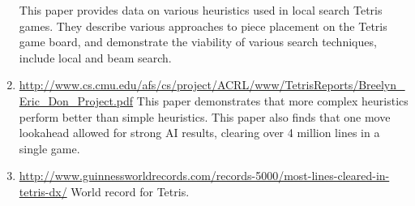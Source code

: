 \documentclass[11pt]{article}
\begin{document}
\begin{enumerate}
This paper provides data on various heuristics used in local search Tetris games. They describe various approaches to piece placement on the Tetris game board, and demonstrate the viability of various search techniques, include local and beam search.
\item \url{http://www.cs.cmu.edu/afs/cs/project/ACRL/www/TetrisReports/Breelyn_Eric_Don_Project.pdf}
This paper demonstrates that more complex heuristics perform better than simple heuristics. This paper also finds that one move lookahead allowed for strong AI results, clearing over 4 million lines in a single game.
\item \url{http://www.guinnessworldrecords.com/records-5000/most-lines-cleared-in-tetris-dx/}
World record for Tetris.
\end{enumerate}
\end{document}

